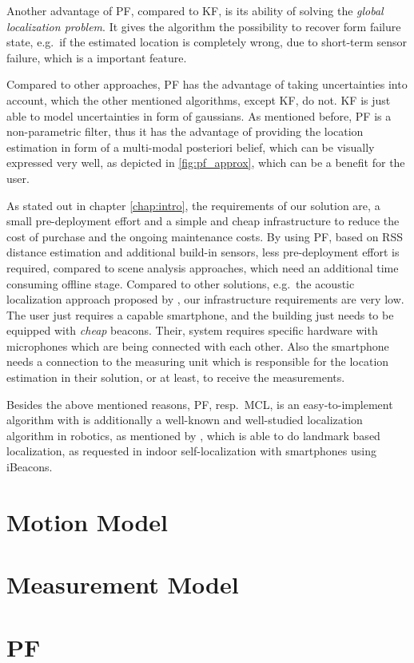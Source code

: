 Another advantage of \acs{PF}, compared to \acs{KF}, is its ability of solving the \emph{global localization problem}. It gives the algorithm the possibility to recover form failure state, e.g.\ if the estimated location is completely wrong, due to short-term sensor failure, which is a important feature.

Compared to other approaches, \acs{PF} has the advantage of taking uncertainties into account, which the other mentioned algorithms, except \acs{KF}, do not. \acs{KF} is just able to model uncertainties in form of gaussians. As mentioned before, \acs{PF} is a non-parametric filter, thus it has the advantage of providing the location estimation in form of a multi-modal posteriori belief, which can be visually expressed very well, as depicted in \ref{fig:pf_approx}, which can be a benefit for the user.

As stated out in chapter \ref{chap:intro}, the requirements of our solution are, a small pre-deployment effort and a simple and cheap infrastructure to reduce the cost of purchase and the ongoing maintenance costs. By using \acs{PF}, based on \acs{RSS} distance estimation and additional build-in sensors, less pre-deployment effort is required, compared to scene analysis approaches, which need an additional time consuming offline stage. Compared to other solutions, e.g.\ the acoustic localization approach proposed by \citet{hoflinger:acoustic}, our infrastructure requirements are very low. The user just requires a capable smartphone, and the building just needs to be equipped with \emph{cheap} beacons. Their, system requires specific hardware with microphones which are being connected with each other. Also the smartphone needs a connection to the measuring unit which is responsible for the location estimation in their solution, or at least, to receive the measurements.

Besides the above mentioned reasons, \acl{PF}, resp.\ \acs{MCL}, is an easy-to-implement algorithm with is additionally a well-known and well-studied localization algorithm in robotics, as mentioned by \citet{thrun:prob_robo}, which is able to do landmark based localization, as requested in indoor self-localization with smartphones using iBeacons.

\section{Motion Model}

\section{Measurement Model}

\section{\acl{PF}}
